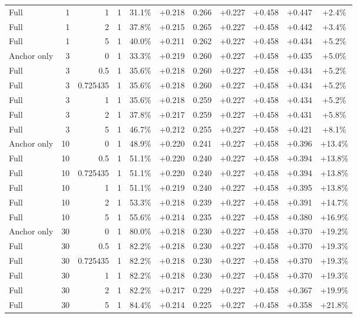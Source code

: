 \begin{table}[htbp]
\begin{tabular}{lrrrccccccc}
Full & 1 & 1 & 1 & 31.1\% & +0.218 & 0.266 & +0.227 & +0.458 & +0.447 & +2.4\% \\
Full & 1 & 2 & 1 & 37.8\% & +0.215 & 0.265 & +0.227 & +0.458 & +0.442 & +3.4\% \\
Full & 1 & 5 & 1 & 40.0\% & +0.211 & 0.262 & +0.227 & +0.458 & +0.434 & +5.2\% \\
Anchor only & 3 & 0 & 1 & 33.3\% & +0.219 & 0.260 & +0.227 & +0.458 & +0.435 & +5.0\% \\
Full & 3 & 0.5 & 1 & 35.6\% & +0.218 & 0.260 & +0.227 & +0.458 & +0.434 & +5.2\% \\
Full & 3 & 0.725435 & 1 & 35.6\% & +0.218 & 0.260 & +0.227 & +0.458 & +0.434 & +5.2\% \\
Full & 3 & 1 & 1 & 35.6\% & +0.218 & 0.259 & +0.227 & +0.458 & +0.434 & +5.2\% \\
Full & 3 & 2 & 1 & 37.8\% & +0.217 & 0.259 & +0.227 & +0.458 & +0.431 & +5.8\% \\
Full & 3 & 5 & 1 & 46.7\% & +0.212 & 0.255 & +0.227 & +0.458 & +0.421 & +8.1\% \\
Anchor only & 10 & 0 & 1 & 48.9\% & +0.220 & 0.241 & +0.227 & +0.458 & +0.396 & +13.4\% \\
Full & 10 & 0.5 & 1 & 51.1\% & +0.220 & 0.240 & +0.227 & +0.458 & +0.394 & +13.8\% \\
Full & 10 & 0.725435 & 1 & 51.1\% & +0.220 & 0.240 & +0.227 & +0.458 & +0.394 & +13.8\% \\
Full & 10 & 1 & 1 & 51.1\% & +0.219 & 0.240 & +0.227 & +0.458 & +0.395 & +13.8\% \\
Full & 10 & 2 & 1 & 53.3\% & +0.218 & 0.239 & +0.227 & +0.458 & +0.391 & +14.7\% \\
Full & 10 & 5 & 1 & 55.6\% & +0.214 & 0.235 & +0.227 & +0.458 & +0.380 & +16.9\% \\
Anchor only & 30 & 0 & 1 & 80.0\% & +0.218 & 0.230 & +0.227 & +0.458 & +0.370 & +19.2\% \\
Full & 30 & 0.5 & 1 & 82.2\% & +0.218 & 0.230 & +0.227 & +0.458 & +0.370 & +19.3\% \\
Full & 30 & 0.725435 & 1 & 82.2\% & +0.218 & 0.230 & +0.227 & +0.458 & +0.370 & +19.3\% \\
Full & 30 & 1 & 1 & 82.2\% & +0.218 & 0.230 & +0.227 & +0.458 & +0.370 & +19.3\% \\
Full & 30 & 2 & 1 & 82.2\% & +0.217 & 0.229 & +0.227 & +0.458 & +0.367 & +19.9\% \\
Full & 30 & 5 & 1 & 84.4\% & +0.214 & 0.225 & +0.227 & +0.458 & +0.358 & +21.8\% \\

\end{tabular}
\end{table}
